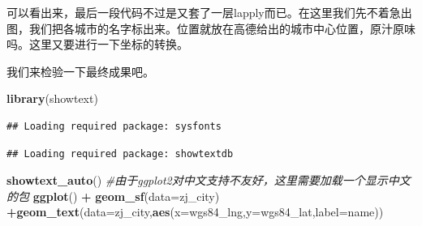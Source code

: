 \documentclass[]{article}
\newenvironment{Shaded}{\begin{snugshade}}{\end{snugshade}}
\newcommand{\KeywordTok}[1]{\textcolor[rgb]{0.13,0.29,0.53}{\textbf{#1}}}
\newcommand{\DataTypeTok}[1]{\textcolor[rgb]{0.13,0.29,0.53}{#1}}
\newcommand{\StringTok}[1]{\textcolor[rgb]{0.31,0.60,0.02}{#1}}
\newcommand{\CommentTok}[1]{\textcolor[rgb]{0.56,0.35,0.01}{\textit{#1}}}
\newcommand{\OperatorTok}[1]{\textcolor[rgb]{0.81,0.36,0.00}{\textbf{#1}}}
\newcommand{\NormalTok}[1]{#1}
\begin{document}
可以看出来，最后一段代码不过是又套了一层lapply而已。在这里我们先不着急出图，我们把各城市的名字标出来。位置就放在高德给出的城市中心位置，原汁原味吗。这里又要进行一下坐标的转换。

\begin{Shaded}
\end{Shaded}

我们来检验一下最终成果吧。

\begin{Shaded}
\begin{Highlighting}[]
\KeywordTok{library}\NormalTok{(showtext)}
\end{Highlighting}
\end{Shaded}

\begin{verbatim}
## Loading required package: sysfonts
\end{verbatim}

\begin{verbatim}
## Loading required package: showtextdb
\end{verbatim}

\begin{Shaded}
\begin{Highlighting}[]
\KeywordTok{showtext_auto}\NormalTok{()                  }\CommentTok{#由于ggplot2对中文支持不友好，这里需要加载一个显示中文的包}
\KeywordTok{ggplot}\NormalTok{() }\OperatorTok{+}\StringTok{ }\KeywordTok{geom_sf}\NormalTok{(}\DataTypeTok{data=}\NormalTok{zj_city) }\OperatorTok{+}\KeywordTok{geom_text}\NormalTok{(}\DataTypeTok{data=}\NormalTok{zj_city,}\KeywordTok{aes}\NormalTok{(}\DataTypeTok{x=}\NormalTok{wgs84_lng,}\DataTypeTok{y=}\NormalTok{wgs84_lat,}\DataTypeTok{label=}\NormalTok{name))}
\end{Highlighting}
\end{Shaded}
\end{document}
